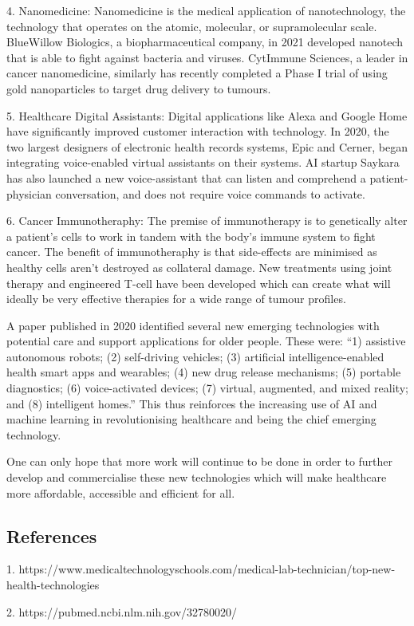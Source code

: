 \documentclass[11pt]{article}
\begin{document}
4. Nanomedicine: Nanomedicine is the medical application of nanotechnology, the technology that operates on the atomic, molecular, or supramolecular scale. BlueWillow Biologics, a biopharmaceutical company, in 2021 developed nanotech that is able to fight against bacteria and viruses. CytImmune Sciences, a leader in cancer nanomedicine,  similarly has recently completed a Phase I trial of using gold nanoparticles to target drug delivery to tumours. 

5. Healthcare Digital Assistants: Digital applications like Alexa and Google Home have significantly improved customer interaction with technology. In 2020, the two largest designers of electronic health records systems, Epic and Cerner, began integrating voice-enabled virtual assistants on their systems. AI startup Saykara has also launched a new voice-assistant that can listen and comprehend a patient-physician conversation, and does not require voice commands to activate. 

6. Cancer Immunotheraphy: The premise of immunotherapy is to genetically alter a patient's cells to work in tandem with the body's immune system to fight cancer. The benefit of immunotheraphy is that side-effects are minimised as healthy cells aren't destroyed as collateral damage. New treatments using joint therapy and engineered T-cell have been developed which can create what will ideally be very effective therapies for a wide range of tumour profiles.  

A paper published in 2020 identified several new emerging technologies with potential care and support applications for older people. These were: ``1) assistive autonomous robots; (2) self-driving vehicles; (3) artificial intelligence-enabled health smart apps and wearables; (4) new drug release mechanisms; (5) portable diagnostics; (6) voice-activated devices; (7) virtual, augmented, and mixed reality; and (8) intelligent homes.'' This thus reinforces the increasing use of AI and machine learning in revolutionising healthcare and being the chief emerging technology. 

One can only hope that more work will continue to be done in order to further develop and commercialise these new technologies which will make healthcare more affordable, accessible and efficient for all. 


\subsection*{References}

1. https://www.medicaltechnologyschools.com/medical-lab-technician/top-new-health-technologies

2. https://pubmed.ncbi.nlm.nih.gov/32780020/
\end{document}
